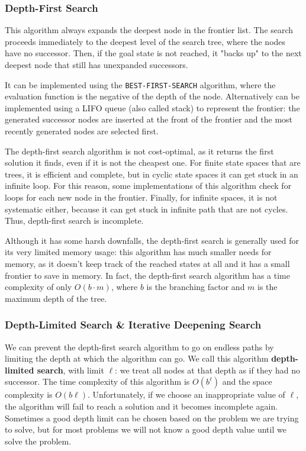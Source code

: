 \documentclass{article}
\newcommand{\code}{\lstinline}
\begin{document}
\subsubsection{Depth-First Search}
This algorithm always expands the deepest node in the frontier list. The search proceeds immediately to the deepest level of the search tree, where the nodes have no successor. Then, if the goal state is not reached, it "backs up" to the next deepest node that still has unexpanded successors. 

It can be implemented using the \code{BEST-FIRST-SEARCH} algorithm, where the evaluation function is the negative of the depth of the node. Alternatively can be implemented using a LIFO queue (also called stack) to represent the frontier: the generated successor nodes are inserted at the front of the frontier and the most recently generated nodes are selected first.

The depth-first search algorithm is not cost-optimal, as it returns the first solution it finds, even if it is not the cheapest one. For finite state spaces that are trees, it is efficient and complete, but in cyclic state spaces it can get stuck in an infinite loop. For this reason, some implementations of this algorithm check for loops for each new node in the frontier. Finally, for infinite spaces, it is not systematic either, because it can get stuck in infinite path that are not cycles. Thus, depth-first search is incomplete.

Although it has some harsh downfalls, the depth-first search is generally used for its very limited memory usage: this algorithm has much smaller needs for memory, as it doesn't keep track of the reached states at all and it has a small frontier to save in memory. In fact, the depth-first search algorithm has a time complexity of only $O(b\cdot m)$, where $b$ is the branching factor and $m$ is the maximum depth of the tree.

\subsubsection{Depth-Limited Search \& Iterative Deepening Search}
We can prevent the depth-first search algorithm to go on endless paths by limiting the depth at which the algorithm can go. We call this algorithm \textbf{depth-limited search}, with limit $\ell$: we treat all nodes at that depth as if they had no successor. The time complexity of this algorithm is $O(b^\ell)$ and the space complexity is $O(b\ell)$. Unfortunately, if we choose an inappropriate value of $\ell$, the algorithm will fail to reach a solution and it becomes incomplete again. Sometimes a good depth limit can be chosen based on the problem we are trying to solve, but for most problems we will not know a good depth value until we solve the problem.
\end{document}
